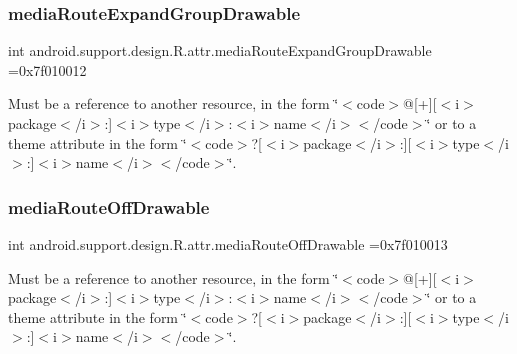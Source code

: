 \subsubsection{\texorpdfstring{media\+Route\+Expand\+Group\+Drawable}{mediaRouteExpandGroupDrawable}}
{\footnotesize\ttfamily int android.\+support.\+design.\+R.\+attr.\+media\+Route\+Expand\+Group\+Drawable =0x7f010012\hspace{0.3cm}{\ttfamily [static]}}

Must be a reference to another resource, in the form \char`\"{}$<$code$>$@\mbox{[}+\mbox{]}\mbox{[}$<$i$>$package$<$/i$>$\+:\mbox{]}$<$i$>$type$<$/i$>$\+:$<$i$>$name$<$/i$>$$<$/code$>$\char`\"{} or to a theme attribute in the form \char`\"{}$<$code$>$?\mbox{[}$<$i$>$package$<$/i$>$\+:\mbox{]}\mbox{[}$<$i$>$type$<$/i$>$\+:\mbox{]}$<$i$>$name$<$/i$>$$<$/code$>$\char`\"{}. \mbox{\label{classandroid_1_1support_1_1design_1_1R_1_1attr_a8ec4ff305503ea2d867e9f60e6cfcba7}} 
\subsubsection{\texorpdfstring{media\+Route\+Off\+Drawable}{mediaRouteOffDrawable}}
{\footnotesize\ttfamily int android.\+support.\+design.\+R.\+attr.\+media\+Route\+Off\+Drawable =0x7f010013\hspace{0.3cm}{\ttfamily [static]}}

Must be a reference to another resource, in the form \char`\"{}$<$code$>$@\mbox{[}+\mbox{]}\mbox{[}$<$i$>$package$<$/i$>$\+:\mbox{]}$<$i$>$type$<$/i$>$\+:$<$i$>$name$<$/i$>$$<$/code$>$\char`\"{} or to a theme attribute in the form \char`\"{}$<$code$>$?\mbox{[}$<$i$>$package$<$/i$>$\+:\mbox{]}\mbox{[}$<$i$>$type$<$/i$>$\+:\mbox{]}$<$i$>$name$<$/i$>$$<$/code$>$\char`\"{}. \mbox{\label{classandroid_1_1support_1_1design_1_1R_1_1attr_a7afb375f1168275b29d8b50d23657aba}} 
